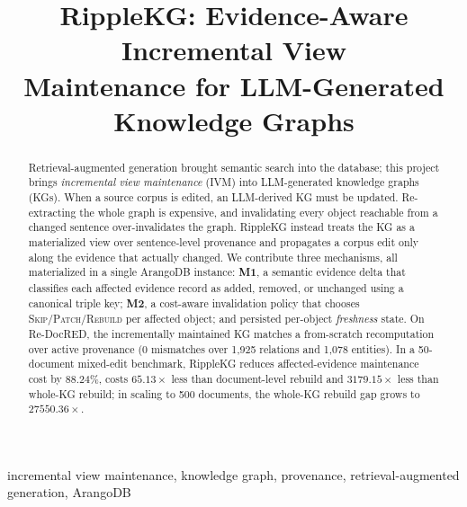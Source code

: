 \documentclass[conference]{IEEEtran}
\begin{document}
\title{RippleKG: Evidence-Aware Incremental View\\Maintenance for LLM-Generated Knowledge Graphs}

\author{%
}

\maketitle

\begin{abstract}
Retrieval-augmented generation brought semantic search into the database;
this project brings \emph{incremental view maintenance} (IVM) into
LLM-generated knowledge graphs (KGs). When a source corpus is edited, an
LLM-derived KG must be updated. Re-extracting the whole graph is expensive, and
invalidating every object reachable from a changed sentence over-invalidates the
graph. RippleKG instead treats the KG as a materialized view over
sentence-level provenance and propagates a corpus edit only along the evidence
that actually changed. We contribute three mechanisms, all materialized in a
single ArangoDB instance: \textbf{M1}, a semantic evidence delta that classifies
each affected evidence record as added, removed, or unchanged using a canonical
triple key; \textbf{M2}, a cost-aware invalidation policy that chooses
\textsc{Skip}/\textsc{Patch}/\textsc{Rebuild} per affected object; and persisted
per-object \emph{freshness} state. On Re-DocRED, the incrementally maintained KG
matches a from-scratch recomputation over active provenance (0 mismatches over
1{,}925 relations and 1{,}078 entities). In a 50-document mixed-edit benchmark,
RippleKG reduces affected-evidence maintenance cost by 88.24\%, costs
$65.13\times$ less than document-level rebuild and $3179.15\times$ less than
whole-KG rebuild; in scaling to 500 documents, the whole-KG rebuild gap grows to
$27550.36\times$.
\end{abstract}

\begin{IEEEkeywords}
incremental view maintenance, knowledge graph, provenance, retrieval-augmented
generation, ArangoDB
\end{IEEEkeywords}
\end{document}
